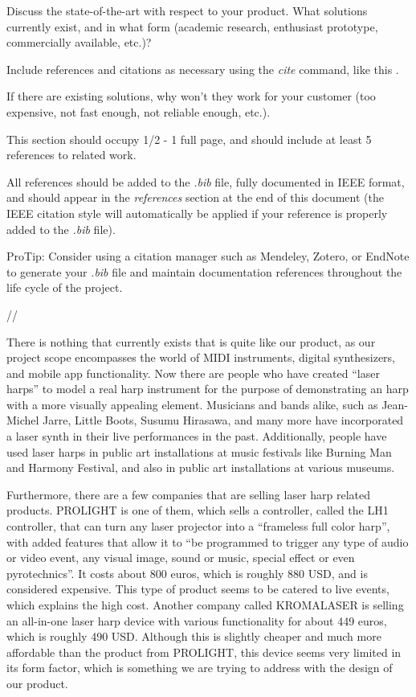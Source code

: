 Discuss the state-of-the-art with respect to your product. What solutions currently exist, and in what form (academic research, enthusiast prototype, commercially available, etc.)?

Include references and citations as necessary using the \textit{cite} command, like this \cite{Rubin2012}.

If there are existing solutions, why won't they work for your customer (too expensive, not fast enough, not reliable enough, etc.).

This section should occupy 1/2 - 1 full page, and should include at least 5 references to related work.

All references should be added to the \textit{.bib} file, fully documented in IEEE format, and should appear in the \textit{references} section at the end of this document (the IEEE citation style will automatically be applied if your reference is properly added to the \textit{.bib} file).

ProTip: Consider using a citation manager such as Mendeley, Zotero, or EndNote to generate your \textit{.bib} file and maintain documentation references throughout the life cycle of the project.

//

There is nothing that currently exists that is quite like our product, as our project scope encompasses the world of MIDI instruments, digital synthesizers, and mobile app functionality. Now there are people who have created “laser harps” to model a real harp instrument for the purpose of demonstrating an harp with a more visually appealing element. Musicians and bands alike, such as Jean-Michel Jarre, Little Boots, Susumu Hirasawa, and many more have incorporated a laser synth in their live performances in the past. Additionally, people have used laser harps in public art installations at music festivals like Burning Man and Harmony Festival, and also in public art installations at various museums.

Furthermore, there are a few companies that are selling laser harp related products. PROLIGHT is one of them, which sells a controller, called the LH1 controller, that can turn any laser projector into a “frameless full color harp”, with added features that allow it to “be programmed to trigger any type of audio or video event, any visual image, sound or music, special effect or even pyrotechnics”. It costs about 800 euros, which is roughly 880 USD, and is considered expensive. This type of product seems to be catered to live events, which explains the high cost. Another company called KROMALASER is selling an all-in-one laser harp device with various functionality for about 449 euros, which is roughly 490 USD. Although this is slightly cheaper and much more affordable than the product from PROLIGHT, this device seems very limited in its form factor, which is something we are trying to address with the design of our product.

